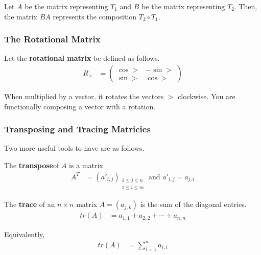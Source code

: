 \begin{thm}
    Let $A$ be the matrix representing $T_1$ and $B$ be the matrix representing $T_2$. Then, the matrix $BA$ represents the composition $T_2 \circ T_1$.
\end{thm}

\subsubsection{The Rotational Matrix} %
\begin{definition}
    Let the \textbf{rotational matrix} be defined as follows.
    \begin{align*}
        R_\gt &=
        \begin{pmatrix}
            \cos \gt & - \sin \gt \\
            \sin \gt & \cos \gt
        \end{pmatrix}
    \end{align*}

    When multiplied by a vector, it rotates the vectors $\gt$ clockwise. You are functionally composing a vector with a rotation.
\end{definition}

\subsubsection{Transposing and Tracing Matricies}
Two more useful tools to have are as follows.
\begin{definition}
    The \textbf{transpose}of $A$ is a matrix 
    \begin{align*}
        A^T &= (a'_{i,j})_{\substack{1 \leq j \leq n \\ 1 \leq i \leq m}} \text{ and } a'_{i,j} = a_{j,i}
    \end{align*}
\end{definition}

\begin{definition}
    The \textbf{trace} of an $n \times n$ matrix $A = (a_{j,k})$ is the sum of the diagonal entries.
    \begin{align*}
        tr(A) &= a_{1, 1} + a_{2, 2} + \cdots + a_{n, n}
    \end{align*} 

    Equivalently,
    \begin{align*}
        tr(A) &= \sum_{i = 1}^{n} a_{i, i}
    \end{align*}
\end{definition}

